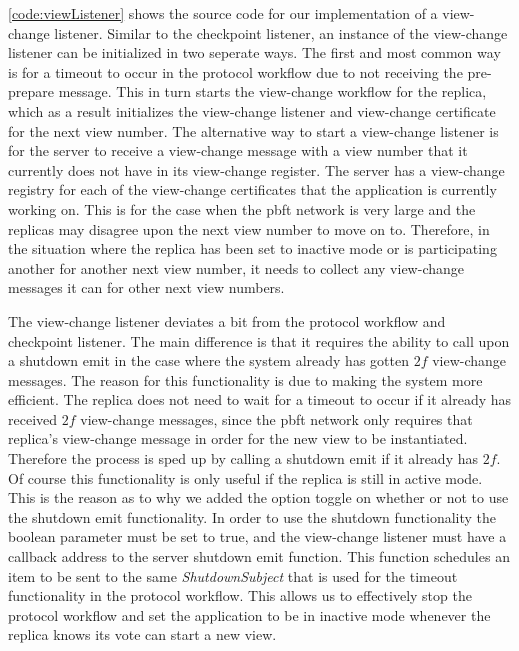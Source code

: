 \iffalse
\autoref{code:viewListener} shows the source code for our implementation of a view-change listener. Similar to the checkpoint listener, an instance of the view-change listener can be initialized in two seperate ways. The first and most common way is for a timeout to occur in the protocol workflow due to not receiving the pre-prepare message. This in turn starts the view-change workflow for the replica, which as a result initializes the view-change listener and view-change certificate for the next view number. The alternative way to start a view-change listener is for the server to receive a view-change message with a view number that it currently does not have in its view-change register. The server has a view-change registry for each of the view-change certificates that the application is currently working on. This is for the case when the \ac{pbft} network is very large and the replicas may disagree upon the next view number to move on to. Therefore, in the situation where the replica has been set to inactive mode or is participating another for another next view number, it needs to collect any view-change messages it can for other next view numbers.

The view-change listener deviates a bit from the protocol workflow and checkpoint listener. The main difference is that it requires the ability to call upon a shutdown emit in the case where the system already has gotten $2f$ view-change messages. The reason for this functionality is due to making the system more efficient. The replica does not need to wait for a timeout to occur if it already has received $2f$ view-change messages, since the \ac{pbft} network only requires that replica's view-change message in order for the new view to be instantiated. Therefore the process is sped up by calling a shutdown emit if it already has $2f$. Of course this functionality is only useful if the replica is still in active mode. This is the reason as to why we added the option toggle on whether or not to use the shutdown emit functionality. In order to use the shutdown functionality the boolean parameter  must be set to true, and the view-change listener must have a callback address to the server shutdown emit function. This function schedules an item to be sent to the same  \emph{ShutdownSubject} that is used for the timeout functionality in the protocol workflow. This allows us to effectively stop the protocol workflow and set the application to be in inactive mode whenever the replica knows its vote can start a new view. 

